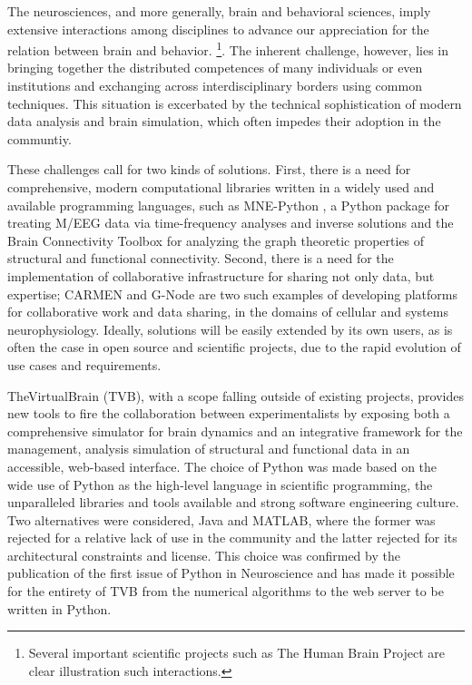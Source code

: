 The neurosciences, and more generally, brain and behavioral sciences, imply
extensive interactions among disciplines to advance our 
appreciation for the relation between brain and behavior. 
\footnote{Several important scientific projects such as The Human Brain Project are clear
illustration such interactions.}. 
The inherent challenge, however, lies in bringing together the distributed competences
of many individuals or even institutions and exchanging across interdisciplinary
borders using common techniques.  
This situation is excerbated by the technical sophistication of modern
data analysis and brain simulation, which often impedes their adoption 
in the communtiy.

These challenges call for two kinds of solutions. First, there is a need
for comprehensive, modern computational libraries written in a widely
used and available programming languages, such as MNE-Python \cite{mnepython},
a Python package for treating M/EEG data via time-frequency analyses and inverse
solutions and the Brain Connectivity
Toolbox \cite{rubinov2010complex} for analyzing the graph theoretic
properties of structural and functional connectivity. Second, there is
a need for the implementation
of collaborative infrastructure for sharing not only data, but expertise; 
CARMEN \cite{austin2011carmen} and G-Node \cite{herz2008g} are two such
examples of developing platforms for collaborative work and data sharing, 
in the domains of cellular and systems neurophysiology.
Ideally, solutions will be easily extended by its own users, as is often
the case in open source and scientific projects, due to the rapid 
evolution of use cases and requirements.

TheVirtualBrain (TVB), with a scope falling outside of existing projects,
provides new tools to fire the collaboration between experimentalists by
exposing both a comprehensive simulator for brain dynamics and an integrative 
framework for the management, analysis simulation of structural and functional
data in an accessible, web-based interface. The choice of Python was made based on
the wide use of Python as the high-level language in scientific programming, 
the unparalleled libraries and tools available and strong software engineering 
culture.
Two alternatives were considered, Java
and MATLAB, where the former was rejected for a relative lack of use in the community
and the latter rejected for its architectural constraints and license. 
This choice was confirmed by the publication of the first issue of Python 
in Neuroscience and has made it possible for the entirety of TVB from the 
numerical algorithms to the web server to be written in Python.

